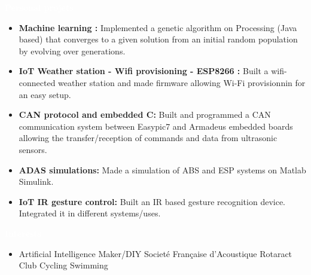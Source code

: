 \documentclass[a4paper, 10pt]{article}
\newcommand{\resheading}[1]{{\large\colorbox{col}{\begin{minipage}{\textwidth\enskip}{\textcolor{white}{\textbf{#1 \vphantom{p\^{E}}}}}\end{minipage}}}\nolinebreak}
\begin{document}
\resheading{Personal projets}
\begin{itemize}

\item\textbf{Machine learning :}
Implemented a genetic algorithm on Processing (Java based) that converges to a given solution from an initial random population by evolving over generations.
\vspace{-5pt}
\item\textbf{IoT Weather station - Wifi provisioning - ESP8266 :}
Built a wifi-connected weather station and made firmware allowing Wi-Fi provisionnin for an easy setup.
\vspace{-5pt}
\item\textbf{CAN protocol and embedded C:}
Built and programmed a CAN communication system between Easypic7 and Armadeus embedded boards allowing the transfer/reception of commands and data from ultrasonic sensors.
\vspace{-5pt}
\item\textbf{ADAS simulations:}
Made a simulation of ABS and ESP systems on Matlab Simulink.
\vspace{-5pt}
\item\textbf{IoT IR gesture control:}
Built an IR based gesture recognition device. Integrated it in different systems/uses.

\end{itemize}

\resheading{Interests}
\begin{itemize}
\item { Artificial Intelligence {\small\textbullet} Maker/DIY {\small\textbullet}  Societé Française d'Acoustique {\small\textbullet}  Rotaract Club {\small\textbullet} Cycling {\small\textbullet}  Swimming}
\end{itemize}
\end{document}
